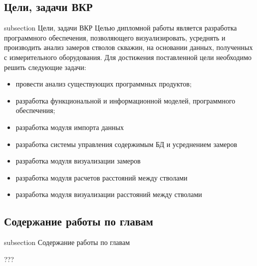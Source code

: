 \subsection*{Цели, задачи ВКР}
 {subsection} {Цели, задачи ВКР}
Целью дипломной работы является разработка программного обеспечения, позволяющего визуализировать, усреднять и производить анализ замеров стволов скважин,
на основании данных, полученных с измерительного оборудования. Для достижения поставленной цели необходимо решить следующие задачи:
\begin{itemize}
  \item провести анализ существующих программных продуктов;
  \item разработка функциональной и информационной моделей, программного обеспечения;
  \item разработка модуля импорта данных
  \item разработка системы управления содержимым БД и усреднением замеров
  \item разработка модуля визуализации замеров
  \item разработка модуля расчетов расстояний между стволами
  \item разработка модуля визуализации расстояний между стволами
\end{itemize}

\subsection*{Содержание работы по главам}
 {subsection} {Содержание работы по главам}

???
